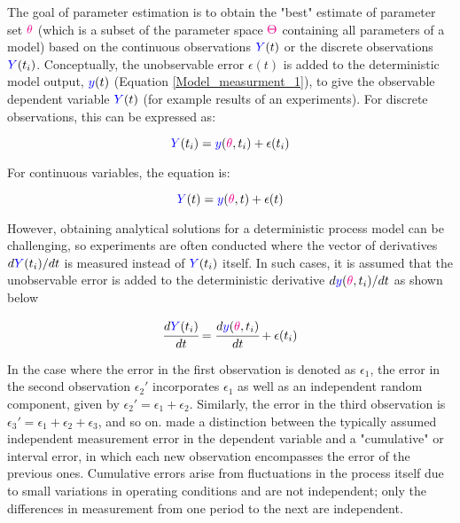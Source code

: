\documentclass[../Article_Model_Parameters.tex]{subfiles}
\begin{document}
	The goal of parameter estimation is to obtain the "best" estimate of parameter set ${\color{magenta} \theta}$ (which is a subset of the parameter space ${\color{magenta}\Theta}$ containing all parameters of a model) based on the continuous observations ${\color{blue}Y}(t)$ or the discrete observations ${\color{blue}Y}(t_i)$. Conceptually, the unobservable error $\epsilon(t)$ is added to the deterministic model output, ${\color{blue}y}(t)$ (Equation \ref{Model_measurment_1}), to give the observable dependent variable ${\color{blue}Y}(t)$ (for example results of an experiments). For discrete observations, this can be expressed as:
	
	{\footnotesize
		\begin{equation*}
			{\color{blue}Y}(t_i) = {\color{blue}y}({\color{magenta} \theta}, t_i) + \epsilon(t_i)
	\end{equation*} }
	
	For continuous variables, the equation is:
	
	{\footnotesize
		\begin{equation*}
			{\color{blue}Y}(t) = {\color{blue}y}({\color{magenta} \theta}, t) + \epsilon(t)
	\end{equation*} }
	
	However, obtaining analytical solutions for a deterministic process model can be challenging, so experiments are often conducted where the vector of derivatives $d{\color{blue}Y}(t_i)/dt$ is measured instead of ${\color{blue}Y}(t_i)$ itself. In such cases, it is assumed that the unobservable error is added to the deterministic derivative $d{\color{blue}y}({\color{magenta} \theta}, t_i)/dt$ as shown below
	
	{\footnotesize
		\begin{equation}  \label{EQ: Measurment_noise}
			\cfrac{d {\color{blue}Y}(t_i)}{dt} = \cfrac{d{\color{blue}y}({\color{magenta} \theta}, t_i)}{dt} + \epsilon(t_i)
	\end{equation} }

	In the case where the error in the first observation is denoted as $\epsilon_1$, the error in the second observation $\epsilon_2'$ incorporates $\epsilon_1$ as well as an independent random component, given by $\epsilon_2' = \epsilon_1 + \epsilon_2$. Similarly, the error in the third observation is $\epsilon_3' = \epsilon_1 + \epsilon_2 + \epsilon_3$, and so on. \citet{Mandel1957}  made a distinction between the typically assumed independent measurement error in the dependent variable and a "cumulative" or interval error, in which each new observation encompasses the error of the previous ones. Cumulative errors arise from fluctuations in the process itself due to small variations in operating conditions and are not independent; only the differences in measurement from one period to the next are independent.
\end{document}
